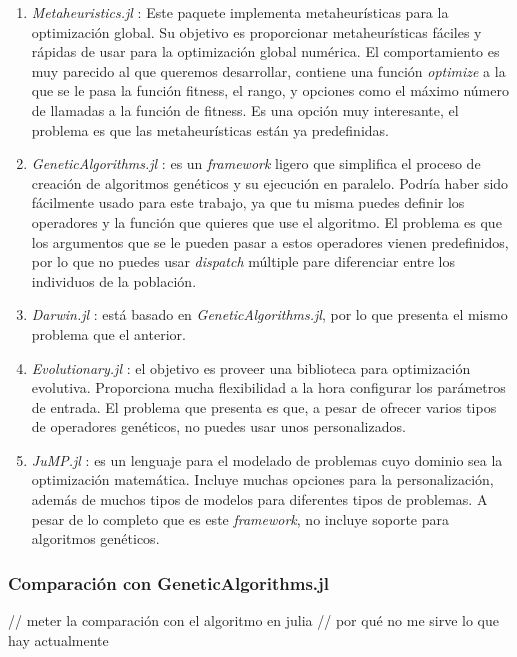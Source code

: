 \begin{enumerate}
    \item \emph{Metaheuristics.jl} \cite{metaheuristics_jl}: Este paquete implementa metaheurísticas para la optimización global. Su objetivo es proporcionar metaheurísticas
    fáciles y rápidas de usar para la optimización global numérica. El comportamiento es muy parecido al que queremos desarrollar, contiene una función \emph{optimize}
    a la que se le pasa la función fitness, el rango, y opciones como el máximo número de llamadas a la función de fitness. Es una opción muy interesante, el problema es que las
    metaheurísticas están ya predefinidas.
    \item \emph{GeneticAlgorithms.jl} \cite{GeneticAlgorithms_jl}: es un \emph{framework} ligero que simplifica el proceso de creación de algoritmos genéticos y su ejecución en
    paralelo. Podría haber sido fácilmente usado para este trabajo, ya que tu misma puedes definir los operadores y la función que quieres que use el algoritmo. El problema es
    que los argumentos que se le pueden pasar a estos operadores vienen predefinidos, por lo que no puedes usar \emph{dispatch} múltiple pare diferenciar entre los individuos de 
    la población.
    \item \emph{Darwin.jl} \cite{darwin_jl}: está basado en \emph{GeneticAlgorithms.jl}, por lo que presenta el mismo problema que el anterior.
    \item \emph{Evolutionary.jl} \cite{evolutionary_jl}: el objetivo es proveer una biblioteca para optimización evolutiva. Proporciona mucha flexibilidad a la hora configurar los parámetros
    de entrada. El problema que presenta es que, a pesar de ofrecer varios tipos de operadores genéticos, no puedes usar unos personalizados.
    \item \emph{JuMP.jl} \cite{DunningHuchetteLubin2017}: es un lenguaje para el modelado de problemas cuyo dominio sea la optimización matemática. Incluye muchas opciones para la personalización,
    además de muchos tipos de modelos para diferentes tipos de problemas. A pesar de lo completo que es este \emph{framework}, no incluye soporte para algoritmos genéticos.
\end{enumerate}

\subsubsection{Comparación con GeneticAlgorithms.jl}
// meter la comparación con el algoritmo en julia
// por qué no me sirve lo que hay actualmente